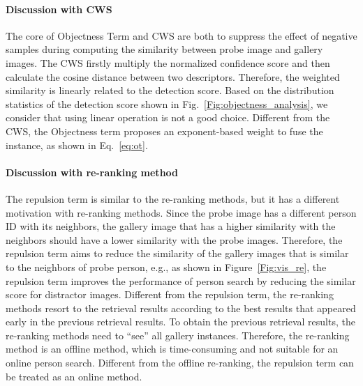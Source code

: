 \documentclass[journal]{IEEEtran}
\begin{document}
\paragraph{Discussion with CWS} 
The core of Objectness Term and CWS are both to suppress the effect of negative samples during computing the similarity between probe image and gallery images. 
The CWS firstly multiply the normalized confidence score and then calculate the cosine distance between two descriptors. 
Therefore, the weighted similarity is linearly related to the detection score.
Based on the distribution statistics of the detection score shown in Fig.~\ref{Fig:objectness_analysis}, we consider that using linear operation is not a good choice. 
Different from the CWS, the Objectness term proposes an exponent-based weight to fuse the instance, as shown in Eq.~\eqref{eq:ot}.

\paragraph{Discussion with re-ranking method}
The repulsion term is similar to the re-ranking methods, but it has a different motivation with re-ranking methods. 
Since the probe image has a different person ID with its neighbors, the gallery image that has a higher similarity with the neighbors should have a lower similarity with the probe images. 
Therefore, the repulsion term aims to reduce the similarity of the gallery images that is similar to the neighbors of probe person, e.g., as shown in Figure~\ref{Fig:vis_re}, the repulsion term improves the performance of person search by reducing the similar score for distractor images. 
Different from the repulsion term, the re-ranking methods resort to the retrieval results according to the best results that appeared early in the previous retrieval results. 
To obtain the previous retrieval results, the re-ranking methods need to ``see'' all gallery instances. 
Therefore, the re-ranking method is an offline method, which is time-consuming and not suitable for an online person search. 
Different from the offline re-ranking, the repulsion term can be treated as an online method. 
\end{document}
